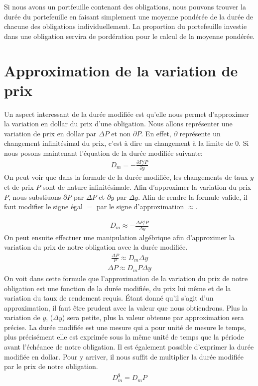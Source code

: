 \documentclass[letterpaper, 12pt]{article}
\newcommand{\1}{\mathds{1}}	%
\theoremstyle{definition}
\begin{document}
Si nous avons un portfeuille contenant des obligations, nous pouvons trouver la durée du portefeuille en faisant simplement une moyenne pondérée de la durée de chacune des obligations individuellement. La proportion du portefeuille investie dans une obligation servira de pordération pour le calcul de la moyenne pondérée.

\section{Approximation de la variation de prix}
Un aspect interessant de la durée modifiée est qu'elle nous permet d'approximer la variation en dollar du prix d'une obligation.  Nous allons représenter une variation de prix en dollar par $\Delta P$ et non $\partial P$. En effet, $\partial$ représente un changement infinitésimal du prix, c'est à dire un changement à la limite de 0. Si nous posons maintenant l'équation de la durée modifiée suivante:
\begin{align*}
D_m =-\frac{\partial P / P}{\partial y}
\end{align*}
On peut voir que dans la formule de la durée modifiée,  les changements de taux $y$ et de prix $P$ sont de nature infinitésimale.  Afin d'approximer la variation du prix $P$, nous substiuons $\partial P$ par $\Delta P$ et $\partial y$ par $\Delta y$.  Afin de rendre la formule valide,  il faut modifier le signe égal $=$ par le signe d'approximation $\approx$.

\begin{align*}
D_m \approx -\frac{\Delta P / P}{\Delta y}
\end{align*}
On peut ensuite effectuer une manipulation algébrique afin d'approximer la variation du prix de notre obligation avec la durée modifiée.
\begin{align*}
\frac{\Delta P}{P} \approx D_m \Delta y
\end{align*}
\begin{align*}
\Delta P \approx D_m P \Delta y
\end{align*}
On voit dans cette formule que l'approximation de la variation du prix de notre obligation est une fonction de la durée modifiée, du prix lui même et de la variation du taux de rendement requis. Étant donné qu'il s'agit d'un approximation, il faut être prudent avec la valeur que nous obtiendrons. Plus la variation de $y$, ($\Delta y$) sera petite, plus la valeur obtenue par approximation sera précise. La durée modifiée est une mesure qui a pour unité de mesure le temps, plus précisément elle est exprimée sous la même unité de temps que la période avant l'échéance de notre obligation. Il est également possible d'exprimer la durée modifiée en dollar. Pour y arriver, il nous suffit de multiplier la durée modifiée par le prix de notre obligation. 
\begin{align*}
D_m^{\$}=D_m P
\end{align*}
\end{document}
